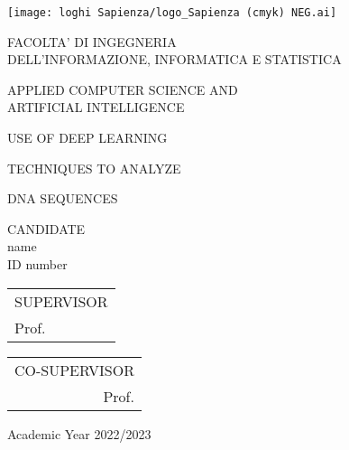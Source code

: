 
\begin{titlepage}
    \begin{center}
    \texttt{[image: loghi Sapienza/logo\_Sapienza (cmyk) NEG.ai]}

    \vspace{1cm}
    \hspace{2cm}
    FACOLTA' DI INGEGNERIA \\
    \hspace{2cm}
    DELL'INFORMAZIONE, INFORMATICA E STATISTICA

    \vspace{0.5cm}
    \hspace{2cm}
     APPLIED COMPUTER SCIENCE AND \\
     \hspace{2cm}
     ARTIFICIAL INTELLIGENCE

    \vspace{2cm}
    \hspace{2cm}
    {\huge USE OF DEEP LEARNING}

    \vspace{0.2 cm}
    \hspace{2cm}
    {\huge TECHNIQUES TO ANALYZE}

    \vspace{0.1 cm}
    \hspace{2cm}
    {\huge DNA SEQUENCES}


   \vspace{6 cm}
   \hspace{2cm}
   CANDIDATE \\
   \hspace{2cm}
   name \\
   \hspace{2cm}
   ID number 

   \vspace{0.5cm}
   \hspace{2cm}
   \begin{tabular}{@{}l@{}}
       SUPERVISOR \\
       Prof.   \\
   \end{tabular}
   \hfill
   \begin{tabular}{@{}r@{}}
       CO-SUPERVISOR \\
       Prof.   \\
   \end{tabular}

   \vspace{1cm}
   \hspace{2cm}
   Academic Year 2022/2023
 \end{center}
\end{titlepage}

